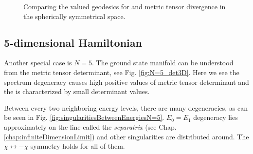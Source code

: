 \begin{figure}[H]
    \centering
    \vspace{50pt}
    \caption{Comparing the  valued geodesics for  and  metric tensor divergence in the spherically symmetrical space. }
    \label{fig:geodesicsinGR}
\end{figure}





\newpage
\subsection{5-dimensional Hamiltonian}
Another special case is $N=5$. The ground state manifold can be understood from the metric tensor determinant, see Fig. \ref{fig:N=5_det3D}. Here we see the spectrum degeneracy causes high positive values of metric tensor determinant and the  is characterized by small determinant values. 

Between every two neighboring energy levels, there are many degeneracies, as can be seen in Fig. \ref{fig:singularitiesBetweenEnergiesN=5}. $E_0=E_1$ degeneracy lies approximately on the line called the \emph{separatrix} (see Chap. \ref{chap:infiniteDimensionLimit}) and other singularities are distributed around. The $\chi\leftrightarrow-\chi$ symmetry holds for all of them.



